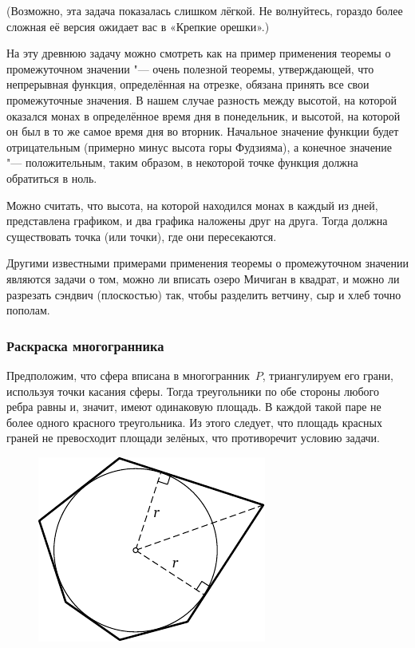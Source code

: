 \documentclass[twoside]{book}
\begin{document}
(Возможно, эта задача показалась слишком лёгкой.
Не волнуйтесь, гораздо более сложная её версия ожидает вас в  «Крепкие орешки».)

На эту древнюю задачу можно смотреть как на пример применения теоремы о промежуточном значении "--- очень полезной теоремы, утверждающей, что непрерывная функция, определённая на отрезке, обязана принять все свои промежуточные значения.
В нашем случае  разность между высотой, на которой оказался монах в определённое время дня в понедельник, и высотой, на которой он был в то же самое время дня во вторник.
Начальное значение функции будет отрицательным (примерно минус высота горы Фудзияма), а конечное значение "--- положительным, таким образом, в некоторой точке функция должна обратиться в ноль.

Можно считать, что высота, на которой находился монах в каждый из дней, представлена графиком, и два графика наложены друг на друга.
Тогда должна существовать точка (или точки), где они пересекаются.

Другими  известными примерами применения теоремы о промежуточном значении являются задачи о том, можно ли вписать озеро Мичиган в квадрат, и можно ли  разрезать сэндвич (плоскостью) так, чтобы разделить ветчину, сыр и хлеб точно пополам.

\subsubsection*{Раскраска многогранника}%

Предположим, что сфера вписана в многогранник~$P$, триангулируем его грани, используя точки касания сферы.
Тогда треугольники по обе стороны любого ребра равны и, значит, имеют одинаковую площадь.
В каждой такой паре не более одного красного треугольника.
Из этого следует, что площадь красных граней не превосходит площади зелёных, что противоречит условию задачи.\heart

\begin{figure}[!ht]
  \vspace{-\baselineskip}
\centering
\includegraphics{mp/wink-13}
\end{figure}
\end{document}
